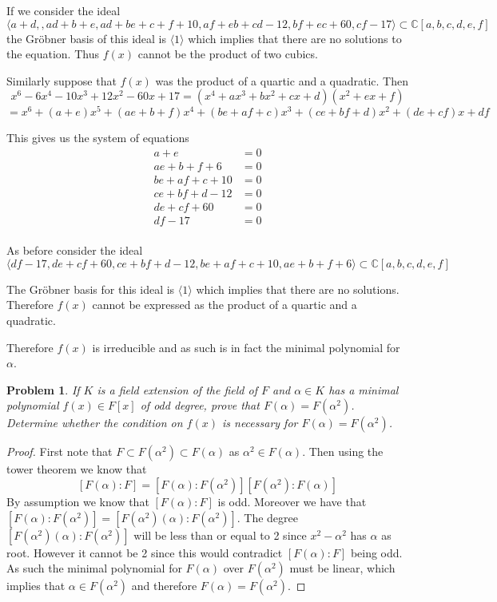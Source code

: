 \documentclass[10pt]{article}
\newcommand{\sk}{\vskip 10mm}
\newcommand{\bb}[1]{\mathbb{#1}}
\theoremstyle{plain}
\newtheorem{problem}{Problem}
\theoremstyle{remark}
\begin{document}
If we consider the ideal
\[\langle a+d,,ad+b+e,ad+be+c+f+10,af+eb+cd-12,bf+ec+60,cf-17\rangle\subset \bb{C}[a,b,c,d,e,f]\]
the Gr\"obner basis of this ideal is $\langle 1\rangle$ which implies that there are no solutions
to the equation. Thus $f(x)$ cannot be the product of two cubics.

Similarly suppose that $f(x)$ was the product of a quartic and a quadratic.
Then
\[ x^{6} - 6 x^{4} - 10 x^{3} + 12 x^{2} - 60 x + 17 = (x^4+ax^3+bx^2+cx+d)(x^2+ex+f)\]
  \[=x^{6} + \left(a + e\right) x^{5} + \left(a e + b + f\right) x^{4} + \left(b e + a f + c\right) x^{3} + \left(c e + b f + d\right) x^{2} + \left(d e + c f\right) x + d f \]

This gives us the system of equations
\begin{align*}
  a+e&= 0\\
  ae+b+f+6&= 0\\
  be+af+c+10&= 0\\
  ce+bf+d-12&= 0\\
  de+cf+60&= 0\\
  df -17&= 0\\
\end{align*}

As before consider the ideal
\[ \langle d f - 17, d e + c f + 60, c e + b f + d - 12, b e + a f + c + 10, a e + b + f + 6\rangle
  \subset \bb{C}[a,b,c,d,e,f] \]

The Gr\"obner basis for this ideal is $\langle 1\rangle$ which implies that there are no solutions.
Therefore $f(x)$ cannot be expressed as the product of a quartic and a quadratic.

Therefore $f(x)$ is irreducible and as such is in fact the minimal polynomial for $\alpha$.

\sk

\begin{problem}
  If $K$ is a field extension of the field of $F$ and
  $\alpha \in K$ has a minimal polynomial $f(x) \in F[x]$ of odd degree,
  prove that $F(\alpha) = F(\alpha^2)$. Determine whether the condition
  on $f(x)$ is necessary for $F(\alpha) = F(\alpha^2)$.
\end{problem}

\begin{proof}
  First note that $F\subset F(\alpha^2)\subset F(\alpha)$ as $\alpha^2\in F(\alpha)$. Then using the tower theorem
  we know that
  \[ [F(\alpha):F] = [F(\alpha):F(\alpha^2)][F(\alpha^2):F(\alpha)] \]
  By assumption we know that $[F(\alpha):F]$ is odd. Moreover we have that
  $[F(\alpha):F(\alpha^2)]=[F(\alpha^2)(\alpha):F(\alpha^2)]$. The degree $[F(\alpha^2)(\alpha):F(\alpha^2)]$ will be
  less than or equal to 2 since $x^2-\alpha^2$ has $\alpha$ as root. However it cannot
  be 2 since this would contradict $[F(\alpha):F]$ being odd. As such the
  minimal polynomial for $F(\alpha)$ over $F(\alpha^2)$ must be linear, which implies
  that $\alpha\in F(\alpha^2)$ and therefore $F(\alpha)=F(\alpha^2)$.
\end{proof}
\end{document}
